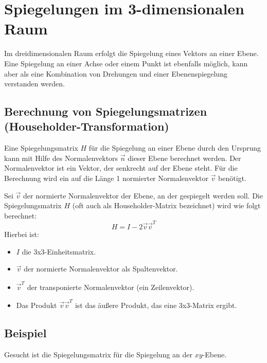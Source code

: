 \section{Spiegelungen im 3-dimensionalen Raum}
Im dreidimensionalen Raum erfolgt die Spiegelung eines Vektors an einer Ebene.
Eine Spiegelung an einer Achse oder einem Punkt ist ebenfalls möglich, kann
aber als eine Kombination von Drehungen und einer Ebenenspiegelung verstanden
werden.

\subsection{Berechnung von Spiegelungsmatrizen (Householder-Transformation)}
Eine Spiegelungsmatrix $H$ für die Spiegelung an einer Ebene durch den Ursprung
kann mit Hilfe des Normalenvektors $\vec{n}$ dieser Ebene berechnet werden. Der
Normalenvektor ist ein Vektor, der senkrecht auf der Ebene steht. Für die
Berechnung wird ein auf die Länge 1 normierter Normalenvektor $\vec{v}$
benötigt.

Sei $\vec{v}$ der normierte Normalenvektor der Ebene, an der gespiegelt werden
soll. Die Spiegelungsmatrix $H$ (oft auch als Householder-Matrix bezeichnet)
wird wie folgt berechnet:
\[ H = I - 2 \vec{v} \vec{v}^T \]
Hierbei ist:
\begin{itemize}
   \item $I$ die 3x3-Einheitsmatrix.
   \item $\vec{v}$ der normierte Normalenvektor als Spaltenvektor.
   \item $\vec{v}^T$ der transponierte Normalenvektor (ein Zeilenvektor).
   \item Das Produkt $\vec{v} \vec{v}^T$ ist das äußere Produkt, das eine 3x3-Matrix
         ergibt.
\end{itemize}

\subsection{Beispiel}
Gesucht ist die Spiegelungsmatrix für die Spiegelung an der $xy$-Ebene.

